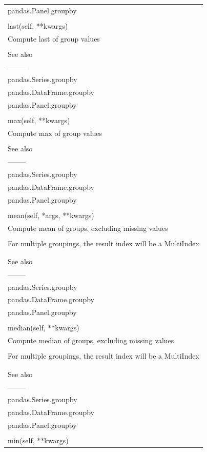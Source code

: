 \documentclass[11pt]{article}
\begin{document}
\begin{enumerate}
\begin{enumerate}
\begin{enumerate}
\begin{center}
\begin{tabular}{l}
pandas.Panel.groupby\\
\\
last(self, **kwargs)\\
Compute last of group values\\
\\
See also\\
--------\\
pandas.Series.groupby\\
pandas.DataFrame.groupby\\
pandas.Panel.groupby\\
\\
max(self, **kwargs)\\
Compute max of group values\\
\\
See also\\
--------\\
pandas.Series.groupby\\
pandas.DataFrame.groupby\\
pandas.Panel.groupby\\
\\
mean(self, *args, **kwargs)\\
Compute mean of groups, excluding missing values\\
\\
For multiple groupings, the result index will be a MultiIndex\\
\\
\\
See also\\
--------\\
pandas.Series.groupby\\
pandas.DataFrame.groupby\\
pandas.Panel.groupby\\
\\
median(self, **kwargs)\\
Compute median of groups, excluding missing values\\
\\
For multiple groupings, the result index will be a MultiIndex\\
\\
\\
See also\\
--------\\
pandas.Series.groupby\\
pandas.DataFrame.groupby\\
pandas.Panel.groupby\\
\\
min(self, **kwargs)\\

\end{tabular}
\end{center}
\end{enumerate}
\end{enumerate}
\end{enumerate}
\end{document}
